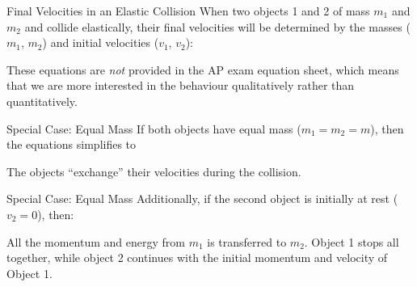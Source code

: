 \documentclass[12pt,compress,aspectratio=169]{beamer}
\begin{document}
\begin{frame}{Final Velocities in an Elastic Collision}
  When two objects 1 and 2 of mass $m_1$ and $m_2$ and  collide elastically,
  their final velocities will be determined by the masses ($m_1$, $m_2$) and
  initial velocities ($v_1$, $v_2$):
  

  These equations are \emph{not} provided in the AP exam equation sheet, which
  means that we are more interested in the behaviour qualitatively rather than
  quantitatively.
\end{frame}




\begin{frame}{Special Case: Equal Mass}
  If both objects have equal mass ($m_1=m_2=m$), then the equations simplifies
  to
  
  
  The objects ``exchange'' their velocities during the collision.
\end{frame}



\begin{frame}{Special Case: Equal Mass}
  Additionally, if the second object is initially at rest ($v_2=0$), then:
  

  All the momentum and energy from $m_1$ is transferred to $m_2$. Object 1
  stops all together, while object 2 continues with the initial momentum and
  velocity of Object 1.
\end{frame}
\end{document}
